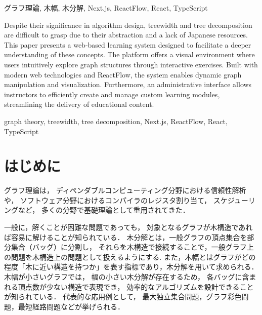 \documentclass[technicalreport]{ieicej}
\begin{document}
\begin{abstract}
木幅はグラフ理論やアルゴリズム設計において重要な概念であるが，
その抽象度の高さや日本語教材の不足により，初学者にとって理解が難しいという課題がある．
そこで本研究では，木幅および木分解の定義理解を促進することを目的とした
Webアプリケーションによる学習支援システムを構築した．
提案システムでは，グラフ構造や木分解を視覚的かつインタラクティブに操作でき，
問題演習を通じて段階的な理解を支援する．
実装には Node.js，Next.js，React，TypeScript，SQLite，Prisma，ReactFlow を用い，
学習コンテンツの作成・拡張が容易となるよう設計した．
\end{abstract}

\begin{keyword}
グラフ理論, 木幅, 木分解, Next.js, ReactFlow, React, TypeScript
\end{keyword}
\begin{eabstract}
Despite their significance in algorithm design, treewidth and tree decomposition are difficult to grasp due to their abstraction and a lack of Japanese resources. 
This paper presents a web-based learning system designed to facilitate a deeper understanding of these concepts. 
The platform offers a visual environment where users intuitively explore graph structures through interactive exercises. 
Built with modern web technologies and ReactFlow, the system enables dynamic graph manipulation and visualization. 
Furthermore, an administrative interface allows instructors to efficiently create and manage custom learning modules, streamlining the delivery of educational content.
\end{eabstract}
\begin{ekeyword}
graph theory, treewidth, tree decomposition, Next.js, ReactFlow, React, TypeScript
\end{ekeyword}
\maketitle

\section{はじめに}
グラフ理論\cite{wilson1979introduction}は，
ディペンダブルコンピューティング分野における信頼性解析や，
ソフトウェア分野におけるコンパイラのレジスタ割り当て，
スケジューリングなど，
多くの分野で基礎理論として重用されてきた．

一般に，解くことが困難な問題であっても，
対象となるグラフが木構造であれば容易に解けることが知られている．
木分解とは，一般グラフの頂点集合を部分集合（バッグ）に分割し，
それらを木構造で接続することで，一般グラフ上の問題を木構造上の問題として扱えるようにする.
また，木幅とはグラフがどの程度「木に近い構造を持つか」を表す指標であり，木分解を用いて求められる\cite{robertson1986graph}．
木幅が小さいグラフでは，
幅の小さい木分解が存在するため，
各バッグに含まれる頂点数が少ない構造で表現でき，
効率的なアルゴリズムを設計できることが知られている\cite{robertson1986graph}．
代表的な応用例として，
最大独立集合問題，グラフ彩色問題，最短経路問題などが挙げられる．
\end{document}
